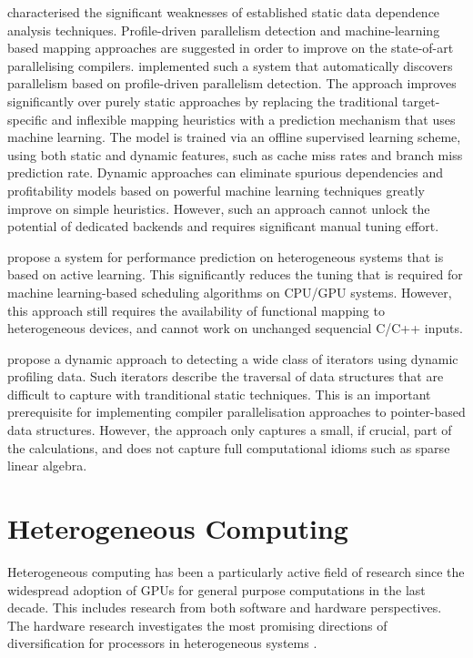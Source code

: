     \citet{Tournavitis:2009:THA:1542476.1542496} characterised the significant
    weaknesses of established static data dependence analysis techniques.
    Profile-driven parallelism detection and machine-learning based mapping
    approaches are suggested in order to improve on the state-of-art
    parallelising compilers.
    \citet{Wang:2014:IPP:2591460.2579561} implemented such a system that
    automatically discovers parallelism based on profile-driven parallelism
    detection.
    The approach improves significantly over purely static approaches by
    replacing the traditional target-specific and inflexible mapping heuristics
    with a prediction mechanism that uses machine learning.
    The model is trained via an offline supervised learning scheme, using both
    static and dynamic features, such as cache miss rates and branch miss
    prediction rate.
    Dynamic approaches can eliminate spurious dependencies and profitability
    models based on powerful machine learning techniques greatly improve on
    simple heuristics.
    However, such an approach cannot unlock the potential of dedicated backends
    and requires significant manual tuning effort.

    \citet{Ogilvie:2014:ALA:2628071.2628128} propose a system for performance
    prediction on heterogeneous systems that is based on active learning.
    This significantly reduces the tuning that is required for
    machine learning-based scheduling algorithms on CPU/GPU systems.
    However, this approach still requires the availability of functional mapping
    to heterogeneous devices, and cannot work on unchanged sequencial C/C++
    inputs.

    \citet{Manilov:2018:GPI:3178372.3179511} propose a dynamic approach to
    detecting a wide class of iterators using dynamic profiling data.
    Such iterators describe the traversal of data structures that are difficult
    to capture with tranditional static techniques.
    This is an important prerequisite for implementing compiler parallelisation
    approaches to pointer-based data structures.
    However, the approach only captures a small, if crucial, part of the
    calculations, and does not capture full computational idioms such
    as sparse linear algebra.


\section{Heterogeneous Computing}

    Heterogeneous computing has been a particularly active field of research
    since the widespread adoption of GPUs for general purpose computations in
    the last decade.
    This includes research from both software and hardware perspectives.
    The hardware research investigates the most promising directions of
    diversification for processors in heterogeneous systems
    \citep{Tomusk:2016:SHC:3012405.3014165}.


